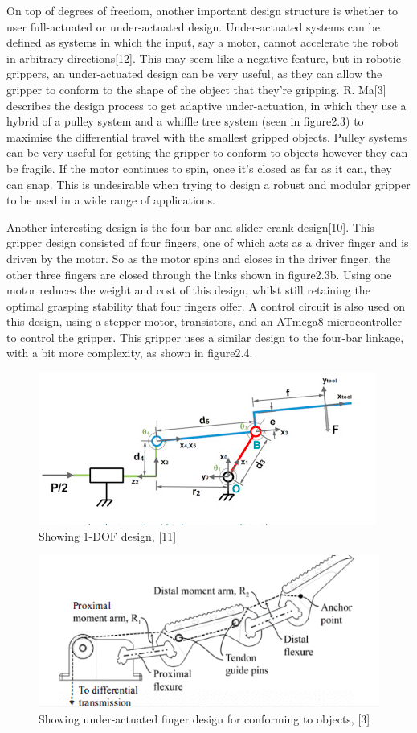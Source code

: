 \documentclass{l4proj}
\begin{document}
On top of degrees of freedom, another important design structure is whether to user full-actuated or under-actuated design. Under-actuated systems can be defined as systems in which the input, say a motor, cannot accelerate the robot in arbitrary directions[12]. This may seem like a negative feature, but in robotic grippers, an under-actuated design can be very useful, as they can allow the gripper to conform to the shape of the object that they're gripping. R. Ma[3] describes the design process to get adaptive under-actuation, in which they use a hybrid of a pulley system and a whiffle tree system (seen in figure2.3) to maximise the differential travel with the smallest gripped objects. Pulley systems can be very useful for getting the gripper to conform to objects however they can be fragile. If the motor continues to spin, once it's closed as far as it can, they can snap. This is undesirable when trying to design a robust and modular gripper to be used in a wide range of applications. 

Another interesting design is the four-bar and slider-crank design[10]. This gripper design consisted of four fingers, one of which acts as a driver finger and is driven by the motor. So as the motor spins and closes in the driver finger, the other three fingers are closed through the links shown in figure2.3b. Using one motor reduces the weight and cost of this design, whilst still retaining the optimal grasping stability that four fingers offer. A control circuit is also used on this design, using a stepper motor, transistors, and an ATmega8 microcontroller to control the gripper. This gripper uses a similar design to the four-bar linkage, with a bit more complexity, as shown in figure2.4.


\begin{figure}[!ht]
  \centering
  \includegraphics[width=0.75\linewidth]{images/image1.png}   
  \caption{Showing 1-DOF design, [11]}
  \label{fig:image1} 
\end{figure}

\begin{figure}[!ht]
  \centering
  \includegraphics[width=0.75\linewidth]{images/image2.png}   

  \caption{Showing under-actuated finger design for conforming to objects, [3]}
\end{figure}
\end{document}
